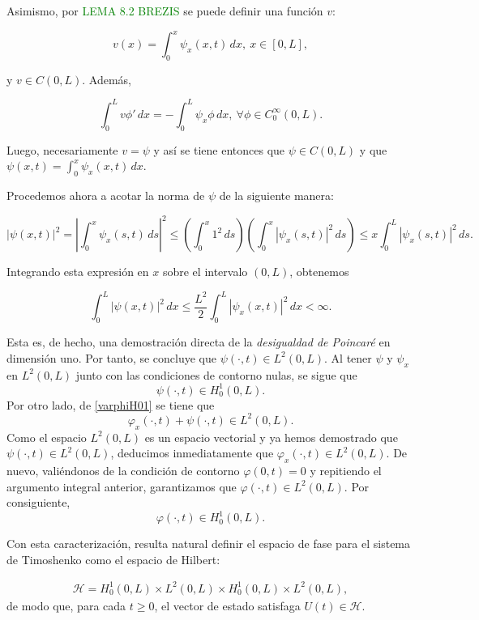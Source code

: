 Asimismo, por \textcolor{green}{LEMA 8.2 BREZIS} se puede definir una función $v$:

\[v(x) = \int_0^x \psi_x(x,t) \, dx, \ x \in [0,L],\]

y $v \in C(0,L)$. Además, 

\[\int_0^L v \phi ' \, dx = - \int_0^L \psi_x \phi \, dx, \ \forall \phi \in C_0^\infty(0,L).\]

Luego, necesariamente $v = \psi$ y así se tiene entonces que $\psi \in C(0,L)$ y que $\psi(x,t) = \int_0^x \psi_x(x,t) \, dx $. 

Procedemos ahora a acotar la norma de $\psi$ de la siguiente manera:

\[
|\psi(x,t)|^2 = \left| \int_0^x \psi_x(s,t) \, ds \right|^2 \leq \left( \int_0^x 1^2 \, ds \right) \left( \int_0^x |\psi_x(s,t)|^2 \, ds \right) \leq x \int_0^L |\psi_x(s,t)|^2 \, ds.
\]

Integrando esta expresión en $x$ sobre el intervalo $(0,L)$, obtenemos

\[
\int_0^L |\psi(x,t)|^2 \, dx \leq \frac{L^2}{2} \int_0^L |\psi_x(x,t)|^2 \, dx < \infty.
\]

Esta es, de hecho, una demostración directa de la \textit{desigualdad de Poincaré} en dimensión uno. Por tanto, se concluye que $\psi(\cdot,t) \in L^2(0,L)$. Al tener $\psi$ y $\psi_x$ en $L^2(0,L)$ junto con las condiciones de contorno nulas, se sigue que
\[
\psi(\cdot,t)\in H_0^1(0,L).
\]
Por otro lado, de \eqref{varphiH01} se tiene que
\[
\varphi_x(\cdot,t)+\psi(\cdot,t)\in L^2(0,L).
\]
Como el espacio $L^2(0,L)$ es un espacio vectorial y ya hemos demostrado que $\psi(\cdot,t)\in L^2(0,L)$, deducimos inmediatamente que $\varphi_x(\cdot,t)\in L^2(0,L)$. De nuevo, valiéndonos de la condición de contorno $\varphi(0,t) = 0$ y repitiendo el argumento integral anterior, garantizamos que $\varphi(\cdot,t) \in L^2(0,L)$. Por consiguiente,
\[
\varphi(\cdot,t)\in H_0^1(0,L).
\]

Con esta caracterización, resulta natural definir el espacio de fase para el sistema de Timoshenko como el espacio de Hilbert\footnotemark:


\begin{align}
    \mathcal{H} = H_0^1(0,L) \times L^2(0,L) \times H_0^1(0,L) \times L^2(0,L),\label{espacioDeFaseTimoshenko}
\end{align}
de modo que, para cada $t \geq 0$, el vector de estado satisfaga $U(t) \in \mathcal{H}$.


